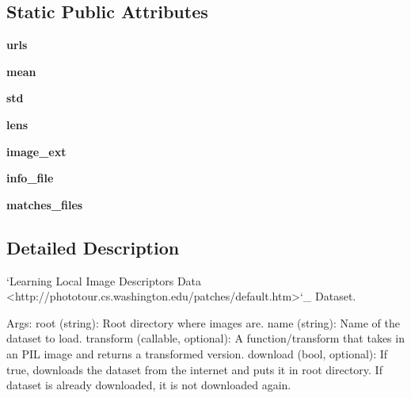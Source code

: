 \subsection*{Static Public Attributes}
\begin{DoxyCompactItemize}
\item 
\mbox{\label{classtorchvision_1_1datasets_1_1phototour_1_1PhotoTour_a6260f6fc8bc5f51d1127a15ad9573993}} 
{\bfseries urls}
\item 
\mbox{\label{classtorchvision_1_1datasets_1_1phototour_1_1PhotoTour_ad057548552af203f9f6794531b3dbcb2}} 
{\bfseries mean}
\item 
\mbox{\label{classtorchvision_1_1datasets_1_1phototour_1_1PhotoTour_a6f259faa3ecda28f932b745d115e0279}} 
{\bfseries std}
\item 
\mbox{\label{classtorchvision_1_1datasets_1_1phototour_1_1PhotoTour_aec066860c70153773b16bb31f343dee8}} 
{\bfseries lens}
\item 
\mbox{\label{classtorchvision_1_1datasets_1_1phototour_1_1PhotoTour_abdab093467edfccba0444d8790b48d38}} 
{\bfseries image\+\_\+ext}
\item 
\mbox{\label{classtorchvision_1_1datasets_1_1phototour_1_1PhotoTour_a8c1aa3e206f98e52c81eb76acf8f8c46}} 
{\bfseries info\+\_\+file}
\item 
\mbox{\label{classtorchvision_1_1datasets_1_1phototour_1_1PhotoTour_a6ef32d53bc7322e84f3ecb9142dcd640}} 
{\bfseries matches\+\_\+files}
\end{DoxyCompactItemize}


\subsection{Detailed Description}
\begin{DoxyVerb}`Learning Local Image Descriptors Data <http://phototour.cs.washington.edu/patches/default.htm>`_ Dataset.


Args:
    root (string): Root directory where images are.
    name (string): Name of the dataset to load.
    transform (callable, optional): A function/transform that  takes in an PIL image
        and returns a transformed version.
    download (bool, optional): If true, downloads the dataset from the internet and
        puts it in root directory. If dataset is already downloaded, it is not
        downloaded again.\end{DoxyVerb}
 

